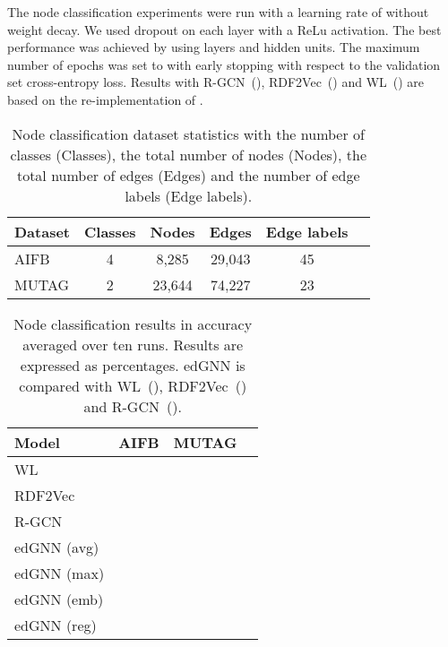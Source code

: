 \documentclass{article} \usepackage{iclr2019_conference,times}
\begin{document}
The node classification experiments were run with a learning rate of   without weight decay. We used dropout  on each layer with a ReLu activation. The best performance was achieved by using  layers and  hidden units. The maximum number of epochs was set to  with early stopping with respect to the validation set cross-entropy loss. Results with R-GCN~(\cite{Schlichtkrull2018}), RDF2Vec~(\cite{Ristoski2016a}) and WL~(\cite{Shervashidze2011}) are based on the re-implementation of \cite{Schlichtkrull2018}. 

\begin{table}[h]
  \caption{Node classification dataset statistics with the number of classes (Classes), the total number of nodes (Nodes), the total number of edges (Edges) and the number of edge labels (Edge labels).}
  \label{tab:node_class_stat}
  \centering
  \begin{tabular}{lccccc}
  \toprule
    Dataset & Classes & Nodes & Edges & Edge labels   \\
    \midrule
    AIFB  &   4 & 8,285  & 29,043  & 45  \\
    MUTAG &   2 & 23,644 & 74,227  & 23  \\
    \bottomrule
  \end{tabular}
\end{table}

\begin{table}[h]
  \caption{Node classification results in accuracy averaged over ten runs. Results are expressed as percentages. edGNN is compared with WL~(\cite{DeVries2015}), RDF2Vec~(\cite{Ristoski2016a}) and R-GCN~(\cite{Schlichtkrull2018}).}
  \label{tab:node_class}
  \centering
  \begin{tabular}{lccc}
  \toprule
    Model & AIFB & MUTAG \\
    \midrule
    WL          &           &   \\
    RDF2Vec     &           &             \\
    R-GCN       &  &            \\
    edGNN (avg) &           &            \\
    edGNN (max) &          &           \\
    \midrule
    edGNN (emb) &           &            \\
    edGNN (reg) &           &            \\
    \bottomrule
  \end{tabular}
\end{table}
\end{document}
